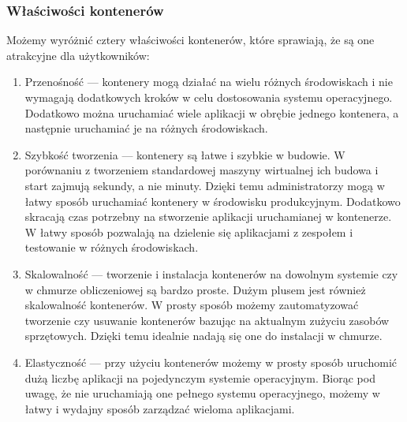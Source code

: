 \documentclass[12pt]{report}
\let\Oldsubsubsection\subsubsection
\renewcommand{\subsubsection}{\FloatBarrier\Oldsubsubsection}
\begin{document}
\subsubsection{Właściwości kontenerów}
Możemy wyróżnić cztery właściwości kontenerów, które sprawiają, że są one atrakcyjne dla użytkowników:

\begin{enumerate}
\item Przenośność --- kontenery mogą działać na wielu różnych środowiskach i nie wymagają dodatkowych kroków w celu dostosowania systemu operacyjnego. Dodatkowo można uruchamiać wiele aplikacji w obrębie jednego kontenera, a następnie uruchamiać je na różnych środowiskach.

\item Szybkość tworzenia --- kontenery są łatwe i szybkie w budowie. W porównaniu z tworzeniem standardowej maszyny wirtualnej ich budowa i start zajmują sekundy, a nie minuty. Dzięki temu administratorzy mogą w łatwy sposób uruchamiać kontenery w środowisku produkcyjnym. Dodatkowo skracają czas potrzebny na stworzenie aplikacji uruchamianej w kontenerze. W łatwy sposób pozwalają na dzielenie się aplikacjami z zespołem i testowanie w różnych środowiskach.

\item Skalowalność --- tworzenie i instalacja kontenerów na dowolnym systemie czy w chmurze obliczeniowej są bardzo proste. Dużym plusem jest również skalowalność kontenerów. W prosty sposób możemy zautomatyzować tworzenie czy usuwanie kontenerów bazując na aktualnym zużyciu zasobów sprzętowych. Dzięki temu idealnie nadają się one do instalacji w chmurze.

\item Elastyczność --- przy użyciu kontenerów możemy w prosty sposób uruchomić dużą liczbę aplikacji na pojedynczym systemie operacyjnym. Biorąc pod uwagę, że nie uruchamiają one pełnego systemu operacyjnego, możemy w łatwy i wydajny sposób zarządzać wieloma aplikacjami. 
\end{enumerate}
\end{document}
